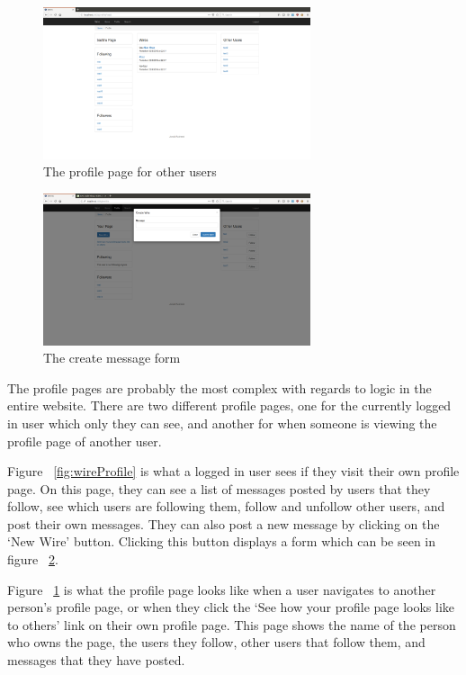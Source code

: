 \begin{figure}[H]
	\centering
	\includegraphics[width=0.7\textwidth]{final_report/pics/otherProfile.png}
	\caption{The profile page for other users}
	\label{fig:wireOtherProfile}
\end{figure}

\begin{figure}[H]
	\centering
	\includegraphics[width=0.7\textwidth]{final_report/pics/createWireForm.png}
	\caption{The create message form}
	\label{fig:wireCreateForm}
\end{figure}


The profile pages are probably the most complex with regards to logic in the
entire website. There are two different profile pages, one for the currently
logged in user which only they can see, and another for when someone is
viewing the profile page of another user.

Figure ~\ref{fig:wireProfile} is what a logged in user sees if they visit
their own profile page. On this page, they can see a list of messages posted
by users that they follow, see which users are following them, follow and
unfollow other users, and post their own messages. They can also post a
new message by clicking on the `New Wire' button. Clicking this button
displays a form which can be seen in figure ~\ref{fig:wireCreateForm}.

Figure ~\ref{fig:wireOtherProfile} is what the profile page looks like
when a user navigates to another person's profile page, or when they click
the `See how your profile page looks like to others' link on their own
profile page. This page shows the name of the person who owns the page,
the users they follow, other users that follow them, and messages that
they have posted.

